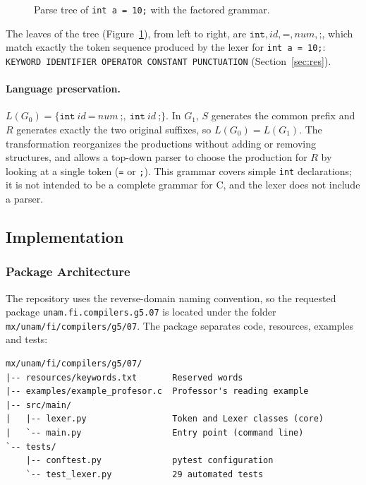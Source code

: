 \documentclass[11pt,letterpaper]{article}
\newcommand{\tok}[1]{\texttt{#1}}
\begin{document}
\begin{figure}[H]
\centering
{}
\caption{Parse tree of \tok{int a = 10;} with the factored grammar.}
\label{fig:tree}
\end{figure}

The leaves of the tree (Figure~\ref{fig:tree}), from left to right, are
$\texttt{int},id,\texttt{=},num,\texttt{;}$, which match exactly the token
sequence produced by the lexer for \tok{int a = 10;}:
\tok{KEYWORD IDENTIFIER OPERATOR CONSTANT PUNCTUATION}
(Section~\ref{sec:res}).

\paragraph{Language preservation.}
$L(G_0)=\{\texttt{int}\ id\ \texttt{=}\ num\ \texttt{;},\ \texttt{int}\ id\ \texttt{;}\}$.
In $G_1$, $S$ generates the common prefix and $R$ generates exactly the two
original suffixes, so $L(G_0)=L(G_1)$. The transformation reorganizes the
productions without adding or removing structures, and allows a top-down
parser to choose the production for $R$ by looking at a single token
(\tok{=} or \tok{;}). This grammar covers simple \tok{int} declarations; it is
not intended to be a complete grammar for C, and the lexer does not include a
parser.

\subsection{Implementation}

\subsubsection{Package Architecture}

The repository uses the reverse-domain naming convention, so the requested
package \tok{unam.fi.compilers.g5.07} is located under the folder
\tok{mx/unam/fi/compilers/g5/07}. The package separates code, resources,
examples and tests:

\par\noindent\begin{minipage}{\linewidth}
\begin{lstlisting}[style=console]
mx/unam/fi/compilers/g5/07/
|-- resources/keywords.txt       Reserved words
|-- examples/example_profesor.c  Professor's reading example
|-- src/main/
|   |-- lexer.py                 Token and Lexer classes (core)
|   `-- main.py                  Entry point (command line)
`-- tests/
    |-- conftest.py              pytest configuration
    `-- test_lexer.py            29 automated tests
\end{lstlisting}
\end{minipage}\par\smallskip
\end{document}
